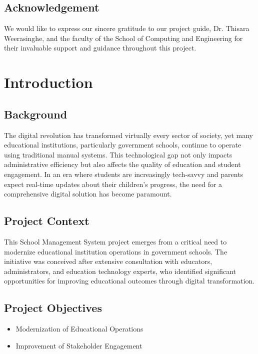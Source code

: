\documentclass[12pt,a4paper]{report}
\begin{document}
\section*{Acknowledgement}
We would like to express our sincere gratitude to our project guide, Dr. Thisara Weerasinghe, and the faculty of the School of Computing and Engineering for their invaluable support and guidance throughout this project.

\newpage
\tableofcontents
\newpage
\renewcommand{\thepage}{\arabic{page}} %
\setcounter{page}{1}

\chapter{Introduction}
\section{Background}
The digital revolution has transformed virtually every sector of society, yet many educational institutions, particularly government schools, continue to operate using traditional manual systems. This technological gap not only impacts administrative efficiency but also affects the quality of education and student engagement. In an era where students are increasingly tech-savvy and parents expect real-time updates about their children's progress, the need for a comprehensive digital solution has become paramount.

\section{Project Context}
This School Management System project emerges from a critical need to modernize educational institution operations in government schools. The initiative was conceived after extensive consultation with educators, administrators, and education technology experts, who identified significant opportunities for improving educational outcomes through digital transformation.

\section{Project Objectives}
\begin{itemize}
    \item Modernization of Educational Operations
    \item Improvement of Stakeholder Engagement
\end{itemize}
\end{document}
